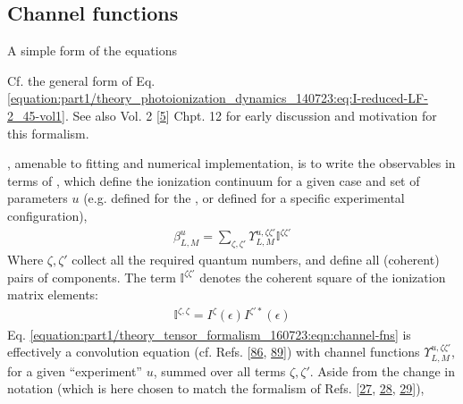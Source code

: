 \documentclass[letterpaper,table,10pt,english]{jupyterBook}
\begin{document}
\subsection{Channel functions}
\label{\detokenize{part1/theory_tensor_formalism_160723:channel-functions}}\label{\detokenize{part1/theory_tensor_formalism_160723:sec-channel-funcs}}
\sphinxAtStartPar
A simple form of the equations%
\begin{footnote}[1]\sphinxAtStartFootnote
Cf. the general form of Eq. \eqref{equation:part1/theory_photoionization_dynamics_140723:eq:I-reduced-LF-2_45-vol1}. See also  Vol. 2 {[}\hyperlink{cite.backmatter/bibliography:id664}{5}{]} Chpt. 12 for early discussion and motivation for this formalism.
%
\end{footnote}, amenable to fitting and numerical implementation, is to write the observables in terms of {\hyperref[\detokenize{backmatter/glossary:term-channel-functions}]{}}, which define the ionization continuum for a given case and set of parameters \(u\) (e.g. defined for the {\hyperref[\detokenize{backmatter/glossary:term-MF}]{}}, or defined for a specific experimental configuration),
\begin{equation}\label{equation:part1/theory_tensor_formalism_160723:eqn:channel-fns}
\begin{split}\beta_{L,M}^{u}=\sum_{\zeta,\zeta'}\varUpsilon_{L,M}^{u,\zeta\zeta'}\mathbb{I}^{\zeta\zeta'}\end{split}
\end{equation}
\sphinxAtStartPar
Where \(\zeta,\zeta'\) collect all the required quantum numbers, and
define all (coherent) pairs of components. The term
\(\mathbb{I}^{\zeta\zeta'}\) denotes the coherent square of the ionization
matrix elements:
\begin{equation}\label{equation:part1/theory_tensor_formalism_160723:eqn:I-zeta}
\begin{split}\mathbb{I}^{\zeta,\zeta}=I^{\zeta}(\epsilon)I^{\zeta'*}(\epsilon)
\end{split}
\end{equation}
\sphinxAtStartPar
Eq. \eqref{equation:part1/theory_tensor_formalism_160723:eqn:channel-fns} is effectively a convolution equation (cf. Refs. {[}\hyperlink{cite.backmatter/bibliography:id821}{86}, \hyperlink{cite.backmatter/bibliography:id625}{89}{]}) with channel functions \(\varUpsilon_{L,M}^{u,\zeta\zeta'}\), for a given “experiment” \(u\), summed over all terms \(\zeta,\zeta'\). Aside from the change in notation (which is here chosen to match the formalism of Refs. {[}\hyperlink{cite.backmatter/bibliography:id747}{27}, \hyperlink{cite.backmatter/bibliography:id617}{28}, \hyperlink{cite.backmatter/bibliography:id786}{29}{]}),
\end{document}
